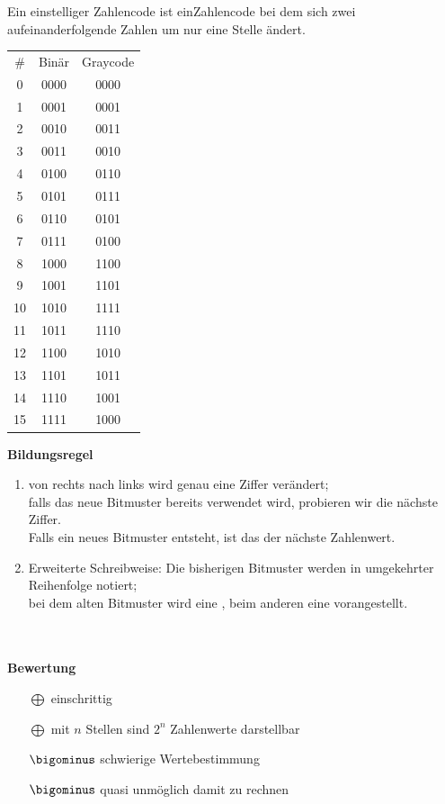 \documentclass[10pt,a4paper]{scrartcl}
\begin{document}
\begin{Theorem}{}{}
	Ein einstelliger Zahlencode ist einZahlencode bei dem sich zwei aufeinanderfolgende Zahlen um nur eine Stelle ändert.
\end{Theorem}

\begin{minipage}{0.45\textwidth}
	\begin{tabular}{c|c|c}
		\# & Binär & Graycode\\
		0 & 0000 & 0000\\
		1 & 0001 & 0001\\
		2 & 0010 & 0011\\
		3 & 0011 & 0010\\
		4 & 0100 & 0110\\
		5 & 0101 & 0111\\
		6 & 0110 & 0101\\
		7 & 0111 & 0100\\
		8 & 1000 & 1100\\
		9 & 1001 & 1101\\
		10 & 1010 & 1111\\
		11 & 1011 & 1110\\
		12 & 1100 & 1010\\
		13 & 1101 & 1011\\
		14 & 1110 & 1001\\
		15 & 1111 & 1000\\
	\end{tabular}
\end{minipage}
\begin{minipage}{0.45\textwidth}
	\textbf{Bildungsregel}\\
	\begin{enumerate}
		\itemsep0em
		\vspace*{-2em}
		\item von rechts nach links wird genau eine Ziffer verändert; \\ falls das neue Bitmuster bereits verwendet wird, probieren wir die nächste Ziffer. \\ Falls ein neues Bitmuster entsteht, ist das der nächste Zahlenwert.
		\item Erweiterte Schreibweise: Die bisherigen Bitmuster werden in umgekehrter Reihenfolge notiert;\\
		bei dem alten Bitmuster wird eine \grqq, beim anderen eine \grqq{} vorangestellt.
	\end{enumerate}
\end{minipage}
\\\\
\textbf{Bewertung}\\
\begin{itemize}
	\itemsep0em
	\vspace*{-2em}
	\item[$\bigoplus$] einschrittig
	\item[$\bigoplus$] mit $ n $ Stellen sind $ 2^n $ Zahlenwerte darstellbar
	\item[$ \bigominus $] schwierige Wertebestimmung
	\item[$ \bigominus $] quasi unmöglich damit zu rechnen
\end{itemize}
\end{document}
